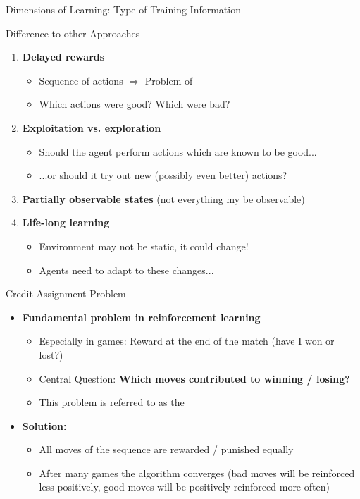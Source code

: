 \begin{frame}{Dimensions of Learning: Type of Training Information}{}
	
\end{frame}


\begin{frame}{Difference to other Approaches}{}
	\begin{enumerate}
		\item \textbf{Delayed rewards}
		\begin{itemize}
			\item Sequence of actions $\Rightarrow$ Problem of 
			\item Which actions were good? Which were bad?
		\end{itemize}
		\item \textbf{Exploitation vs. exploration}
		\begin{itemize}
			\item Should the agent perform actions which are known to be good...
			\item ...or should it try out new (possibly even better) actions?
		\end{itemize}
		\item \textbf{Partially observable states} (not everything my be observable)
		\item \textbf{Life-long learning} 
		\begin{itemize}
			\item Environment may not be static, it could change!
			\item Agents need to adapt to these changes...
		\end{itemize}
	\end{enumerate}
\end{frame}


\begin{frame}{Credit Assignment Problem}{}
	\begin{itemize}
		\item \textbf{Fundamental problem in reinforcement learning}
		\begin{itemize}
			\item Especially in games: Reward at the end of the match (have I won or lost?)
			\item Central Question: \textbf{Which moves contributed to winning / losing?}
			\item This problem is referred to as the 
		\end{itemize}
		\item \textbf{Solution:}
		\begin{itemize}
			\item All moves of the sequence are rewarded / punished equally
			\item After many games the algorithm converges (bad moves will be reinforced less positively, good moves will be positively reinforced more often)
		\end{itemize}
	\end{itemize}
\end{frame}


